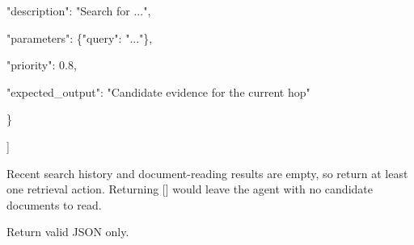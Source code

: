 \begin{tcolorbox}[colback=white, colframe=my-green, coltitle=black, parskip=5mm, title=\textbf{Hop Plan}, halign=flush left, enhanced, breakable, skin first=enhanced, skin middle=enhanced, skin last=enhanced]
\begin{scriptsize}
    "description": "Search for ...",\par
    "parameters": \{"query": "..."\},\par
    "priority": 0.8,\par
    "expected\_output": "Candidate evidence for the current hop"\par
  \}\par
]\par
\mbox{}\par
Recent search history and document-reading results are empty, so return at least one retrieval action. Returning [] would leave the agent with no candidate documents to read.\par
Return valid JSON only.\par
\end{scriptsize}
\end{tcolorbox}

